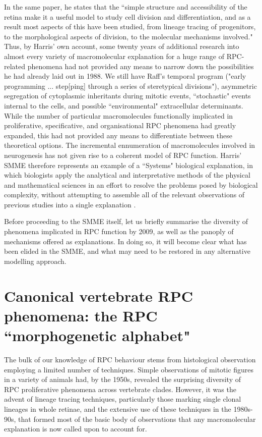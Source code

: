 In the same paper, he states that the ``simple structure and accessibility of the retina make it a useful model to study cell division and differentiation, and as a result most aspects of this have been studied, from lineage tracing of progenitors, to the morphological aspects of division, to the molecular mechanisms involved." Thus, by Harris' own account, some twenty years of additional research into almost every variety of macromolecular explanation for a huge range of RPC-related phenomena had not provided any means to narrow down the possibilities he had already laid out in 1988. We still have Raff's temporal program ("early programming ... step[ping] through a series of steretypical divisions"), asymmetric segregation of cytoplasmic inheritants during mitotic events, ``stochastic" events internal to the cells, and possible ``environmental" extracellular determinants. While the number of particular macromolecules functionally implicated in proliferative, specificative, and organisational RPC phenomena had greatly expanded, this had not provided any means to differentiate between these theoretical options. The incremental ennumeration of macromolecules involved in neurogenesis has not given rise to a coherent model of RPC function. Harris' SMME therefore represents an example of a ``Systems" biological explanation, in which biologists apply the analytical and interpretative methods of the physical and mathematical sciences in an effort to resolve the problems posed by biological complexity, without attempting to assemble all of the relevant observations of previous studies into a single explanation \cite{Morange2009}.

Before proceeding to the SMME itself, let us briefly summarise the diversity of phenomena implicated in RPC function by 2009, as well as the panoply of mechanisms offered as explanations. In doing so, it will become clear what has been elided in the SMME, and what may need to be restored in any alternative modelling approach.

\section{Canonical vertebrate RPC phenomena: the RPC ``morphogenetic alphabet"}

The bulk of our knowledge of RPC behaviour stems from histological observation employing a limited number of techniques. Simple observations of mitotic figures in a variety of animals had, by the 1950s, revealed the surprising diversity of RPC proliferative phenomena across vertebrate clades. However, it was the advent of lineage tracing techniques, particularly those marking single clonal lineages in whole retinae, and the extensive use of these techniques in the 1980s-90s, that formed most of the basic body of observations that any macromolecular explanation is now called upon to account for.

